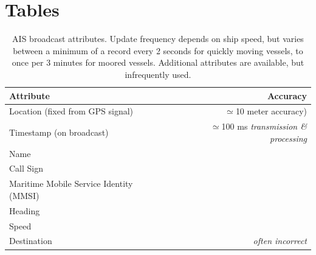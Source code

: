 





\chapter{Tables}

\begin{table}[htbp]
  \caption[AIS broadcast attributes]{AIS broadcast attributes. Update frequency depends on ship speed, but varies between a minimum of a record every 2 seconds for quickly moving vessels, to once per 3 minutes for moored vessels. Additional attributes are available, but infrequently used.}
  \begin{tabular}{lr}
    \hline
    Attribute & Accuracy \\
    \hline
    Location (fixed from GPS signal) & $\simeq$10 meter accuracy) \\
    Timestamp (on broadcast) & $\simeq$100 ms \textit{transmission \& processing}\\
    Name \\
    Call Sign \\
    Maritime Mobile Service Identity (MMSI) \\
    Heading \\
    Speed \\
    Destination & \textit{often incorrect}
  \end{tabular}
  \label{table:ais-broadcast-attributes}
\end{table}


